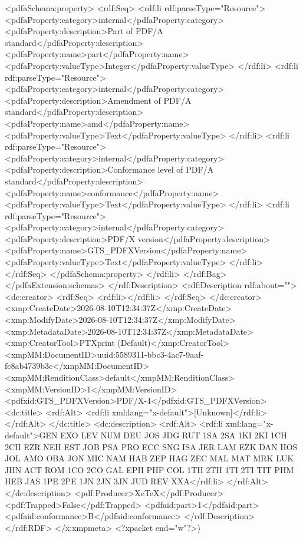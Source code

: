 {              <pdfaSchema:property>
                <rdf:Seq>
                  <rdf:li rdf:parseType="Resource">
                    <pdfaProperty:category>internal</pdfaProperty:category>
                    <pdfaProperty:description>Part of PDF/A standard</pdfaProperty:description>
                    <pdfaProperty:name>part</pdfaProperty:name>
                    <pdfaProperty:valueType>Integer</pdfaProperty:valueType>
                  </rdf:li>
                  <rdf:li rdf:parseType="Resource">
                    <pdfaProperty:category>internal</pdfaProperty:category>
                    <pdfaProperty:description>Amendment of PDF/A standard</pdfaProperty:description>
                    <pdfaProperty:name>amd</pdfaProperty:name>
                    <pdfaProperty:valueType>Text</pdfaProperty:valueType>
                  </rdf:li>
                  <rdf:li rdf:parseType="Resource">
                    <pdfaProperty:category>internal</pdfaProperty:category>
                    <pdfaProperty:description>Conformance level of PDF/A standard</pdfaProperty:description>
                    <pdfaProperty:name>conformance</pdfaProperty:name>
                    <pdfaProperty:valueType>Text</pdfaProperty:valueType>
                  </rdf:li>
                  <rdf:li rdf:parseType="Resource">
                    <pdfaProperty:category>internal</pdfaProperty:category>
                    <pdfaProperty:description>PDF/X version</pdfaProperty:description>
                    <pdfaProperty:name>GTS_PDFXVersion</pdfaProperty:name>
                    <pdfaProperty:valueType>Text</pdfaProperty:valueType>
                  </rdf:li>
                </rdf:Seq>
              </pdfaSchema:property>
            </rdf:li>
          </rdf:Bag>
        </pdfaExtension:schemas>
      </rdf:Description>
      <rdf:Description rdf:about="">
        <dc:creator>
          <rdf:Seq>
            <rdf:li></rdf:li>
          </rdf:Seq>
        </dc:creator>
        <xmp:CreateDate>2026-08-10T12:34:37Z</xmp:CreateDate>
        <xmp:ModifyDate>2026-08-10T12:34:37Z</xmp:ModifyDate>
        <xmp:MetadataDate>2026-08-10T12:34:37Z</xmp:MetadataDate>
        <xmp:CreatorTool>PTXprint (Default)</xmp:CreatorTool>
        <xmpMM:DocumentID>uuid:5589311-bbc3-4ac7-9aaf-fc8ab4739b3c</xmpMM:DocumentID>
        <xmpMM:RenditionClass>default</xmpMM:RenditionClass>
        <xmpMM:VersionID>1</xmpMM:VersionID>
        <pdfxid:GTS_PDFXVersion>PDF/X-4</pdfxid:GTS_PDFXVersion>
        <dc:title>
          <rdf:Alt>
            <rdf:li xml:lang="x-default">[Unknown]</rdf:li>
          </rdf:Alt>
        </dc:title>
        <dc:description>
          <rdf:Alt>
            <rdf:li xml:lang="x-default">GEN EXO LEV NUM DEU JOS JDG RUT 1SA 2SA 1KI 2KI 1CH 2CH EZR NEH EST JOB PSA PRO ECC SNG ISA JER LAM EZK DAN HOS JOL AMO OBA JON MIC NAM HAB ZEP HAG ZEC MAL MAT MRK LUK JHN ACT ROM 1CO 2CO GAL EPH PHP COL 1TH 2TH 1TI 2TI TIT PHM HEB JAS 1PE 2PE 1JN 2JN 3JN JUD REV XXA</rdf:li>
          </rdf:Alt>
        </dc:description>
        <pdf:Producer>XeTeX</pdf:Producer>
        <pdf:Trapped>False</pdf:Trapped>
      <pdfaid:part>1</pdfaid:part>
      <pdfaid:conformance>B</pdfaid:conformance>
      </rdf:Description>
  </rdf:RDF>
</x:xmpmeta>
<?xpacket end="w"?>)}
